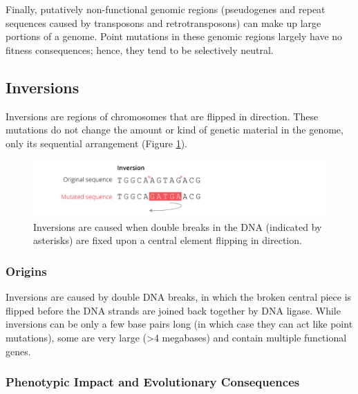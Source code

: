 \documentclass[
]{book}
\begin{document}
Finally, putatively non-functional genomic regions (pseudogenes and repeat sequences caused by transposons and retrotransposons) can make up large portions of a genome. Point mutations in these genomic regions largely have no fitness consequences; hence, they tend to be selectively neutral.

\hypertarget{inversions}{%
\subsection{Inversions}\label{inversions}}

Inversions are regions of chromosomes that are flipped in direction. These mutations do not change the amount or kind of genetic material in the genome, only its sequential arrangement (Figure \ref{fig:inversion}).

\begin{figure}
\includegraphics[width=1\linewidth]{images/inversion} \caption{Inversions are caused when double breaks in the DNA (indicated by asterisks) are fixed upon a central element flipping in direction.}\label{fig:inversion}
\end{figure}

\hypertarget{origins-1}{%
\subsubsection*{Origins}\label{origins-1}}

Inversions are caused by double DNA breaks, in which the broken central piece is flipped before the DNA strands are joined back together by DNA ligase. While inversions can be only a few base pairs long (in which case they can act like point mutations), some are very large (\textgreater4 megabases) and contain multiple functional genes.

\hypertarget{phenotypic-impact-and-evolutionary-consequences-1}{%
\subsubsection*{Phenotypic Impact and Evolutionary Consequences}\label{phenotypic-impact-and-evolutionary-consequences-1}}
\end{document}
